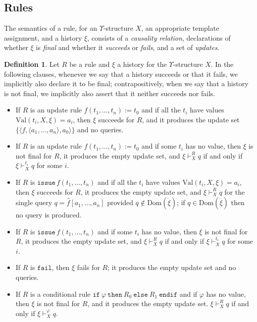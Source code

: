 \documentclass{LMCS}
\theoremstyle{definition}
\newtheorem{df}[thm]{Definition}
\newenvironment{ls}{\begin{itemize}}{\end{itemize}}
\newcommand{\U}{\Upsilon}
\newcommand{\ans}{\dot}
\newcommand{\dom}[1]{\ensuremath{{\text{Dom}}(#1)}}
\newcommand{\sq}[1]{\ensuremath{\langle#1\rangle}}
\newcommand{\ttt}[1]{\ensuremath{\mathtt {#1}}}
\newcommand{\val}[3]{\ensuremath{\text{Val}(#1,#2,#3)}}
\renewcommand{\phi}{\varphi}
\begin{document}
\subsection{Rules}

The semantics of a rule, for an $\U$-structure $X$, an appropriate
template assignment, and a history $\xi$, consists of a \emph{causality
relation}, declarations of whether $\xi$ is \emph{final} and whether it
\emph{succeeds} or \emph{fails}, and a set of \emph{updates}.

\begin{df}
  Let $R$ be a rule and $\xi$ a history for the $\U$-structure $X$.  In the
  following clauses, whenever we say that a history succeeds or that
  it fails, we implicitly also declare it to be final;
  contrapositively, when we say that a history is not final, we
  implicitly also assert that it neither succeeds nor fails.
  \begin{ls}
    \item If $R$ is an update rule $f(t_1,\dots,t_n):=t_0$ and if all
    the $t_i$ have values $\val{t_i}X\xi=a_i$, then $\xi$ succeeds for
    $R$, and it produces the update set
    $\{\sq{f,\sq{a_1,\dots,a_n},a_0}\}$ and no queries.
    \item If $R$ is an update rule $f(t_1,\dots,t_n):=t_0$ and if some
    $t_i$ has no value, then $\xi$ is not final for $R$, it produces
    the empty update set, and $\xi\vdash^R_Xq$ if and only if
    $\xi\vdash^{t_i}_Xq$ for some $i$.
  \item If $R$ is $\ttt{issue\,}f(t_1,\dots,t_n)$ and if all the $t_i$
  have values $\val{t_i}X\xi=a_i$, then $\xi$ succeeds for $R$, it
  produces the empty update set, and $\xi\vdash^R_Xq$ for the single
  query $q=\hat f[a_1,\dots,a_n]$ provided $q\notin\dom{\ans\xi}$; if
  $q\in\dom{\ans\xi}$ then no query is produced.
    \item If $R$ is $\ttt{issue\,}f(t_1,\dots,t_n)$ and if some $t_i$
    has no value, then $\xi$ is not final for $R$, it produces the
    empty update set, and $\xi\vdash^R_Xq$ if and only if
    $\xi\vdash^{t_i}_Xq$ for some $i$.
  \item If $R$ is \ttt{fail}, then $\xi$ fails for
    $R$; it produces the empty update set and no queries.
    \item If $R$ is a conditional rule $\ttt{if\ } \phi \ttt{\ then\ }
R_0 \ttt{\ else\ } R_1 \ttt{\ endif}$ and if $\phi$ has no value, then
$\xi$ is not final for $R$, and it produces the empty update set.
$\xi\vdash^R_Xq$ if and only if $\xi\vdash^\phi_Xq$.

\end{ls}
\end{df}
\end{document}
